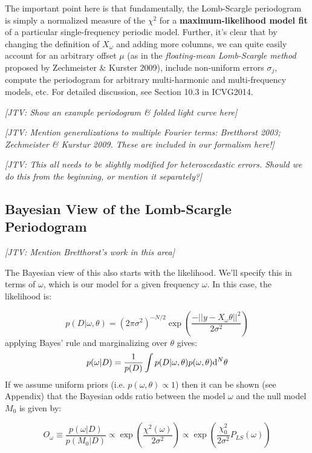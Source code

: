 \documentclass[12pt,pdftex]{article}
\newcommand{\jake}[1]{{\color{blue}\it[JTV: #1]}}
\begin{document}
The important point here is that fundamentally, the Lomb-Scargle periodogram is simply a normalized measure of the $\chi^2$ for a {\bf maximum-likelihood model fit} of a particular single-frequency periodic model. Further, it's clear that by changing the definition of $X_\omega$ and adding more columns, we can quite easily account for an arbitrary offset $\mu$ (as in the {\it floating-mean Lomb-Scargle method} proposed by Zechmeister \& Kurster 2009), include non-uniform errors $\sigma_j$, compute the periodogram for arbitrary multi-harmonic and multi-frequency models, etc. For detailed discussion, see Section 10.3 in ICVG2014.

\jake{Show an example periodogram \& folded light curve here}

\jake{Mention generalizations to multiple Fourier terms: Bretthorst 2003; Zechmeister \& Kurstur 2009. These are included in our formalism here!}

\jake{This all needs to be slightly modified for heteroscedastic errors. Should we do this from the beginning, or mention it separately?}

\subsection{Bayesian View of the Lomb-Scargle Periodogram}
\jake{Mention Bretthorst's work in this area}

The Bayesian view of this also starts with the likelihood.
We'll specify this in terms of $\omega$, which is our model for a given frequency $\omega$. In this case, the likelihood is:

\begin{equation}
  p(D|\omega,\theta) =
  (2\pi\sigma^2)^{-N/2} \exp\left(
  \frac{-||y - X_\omega\theta||^2}{2\sigma^2}
  \right)
\end{equation}
applying Bayes' rule and marginalizing over $\theta$ gives:
\begin{equation}
  p(\omega|D) = \frac{1}{p(D)}\int p(D|\omega,\theta)p(\omega, \theta){\rm d}^N\theta
\end{equation}
If we assume uniform priors (i.e. $p(\omega, \theta) \propto 1$) then it can be shown (see Appendix) that the Bayesian odds ratio between the model $\omega$ and the null model $M_0$ is given by:

\begin{equation}
  O_\omega \equiv \frac{p(\omega|D)}{p(M_0|D)} \propto \exp\left(\frac{\chi^2(\omega)}{2\sigma^2}\right) \propto \exp\left(\frac{\chi_0^2}{2\sigma^2}P_{LS}(\omega)\right)
\end{equation}
\end{document}

